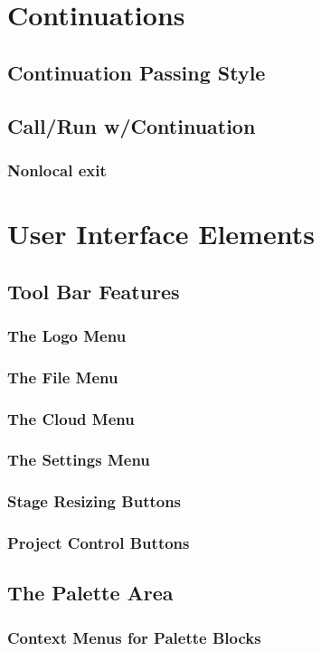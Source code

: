 \documentclass{report}
\begin{document}
\chapter{Continuations}
\section{Continuation Passing Style}
\section{Call/Run w/Continuation}
\subsection{Nonlocal exit}
\chapter{User Interface Elements}
\section{Tool Bar Features}
\subsection{The \Snap{} Logo Menu}
\subsection{The File Menu}
\subsection{The Cloud Menu}
\subsection{The Settings Menu}
\subsection{Stage Resizing Buttons}
\subsection{Project Control Buttons}
\section{The Palette Area}
\subsection{Context Menus for Palette Blocks}
\end{document}
